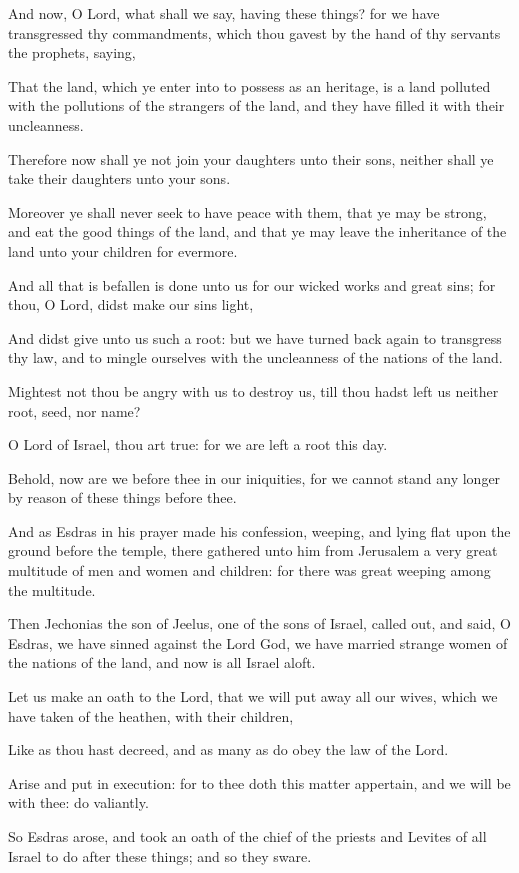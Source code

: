 {\par }{\PP {}And now, O Lord, what shall we say, having these things? for we have transgressed thy commandments, which thou gavest by the hand of thy servants the prophets, saying,
\par }{\PP {}That the land, which ye enter into to possess as an heritage, is a land polluted with the pollutions of the strangers of the land, and they have filled it with their uncleanness.
\par }{\PP {}Therefore now shall ye not join your daughters unto their sons, neither shall ye take their daughters unto your sons.
\par }{\PP {}Moreover ye shall never seek to have peace with them, that ye may be strong, and eat the good things of the land, and that ye may leave the inheritance of the land unto your children for evermore.
\par }{\PP {}And all that is befallen is done unto us for our wicked works and great sins; for thou, O Lord, didst make our sins light,
\par }{\PP {}And didst give unto us such a root: but we have turned back again to transgress thy law, and to mingle ourselves with the uncleanness of the nations of the land.
\par }{\PP {}Mightest not thou be angry with us to destroy us, till thou hadst left us neither root, seed, nor name?
\par }{\PP {}O Lord of Israel, thou art true: for we are left a root this day.
\par }{\PP {}Behold, now are we before thee in our iniquities, for we cannot stand any longer by reason of these things before thee.
\par }{\PP {}And as Esdras in his prayer made his confession, weeping, and lying flat upon the ground before the temple, there gathered unto him from Jerusalem a very great multitude of men and women and children: for there was great weeping among the multitude.
\par }{\PP {}Then Jechonias the son of Jeelus, one of the sons of Israel, called out, and said, O Esdras, we have sinned against the Lord God, we have married strange women of the nations of the land, and now is all Israel aloft.
\par }{\PP {}Let us make an oath to the Lord, that we will put away all our wives, which we have taken of the heathen, with their children,
\par }{\PP {}Like as thou hast decreed, and as many as do obey the law of the Lord.
\par }{\PP {}Arise and put in execution: for to thee doth this matter appertain, and we will be with thee: do valiantly.
\par }{\PP {}So Esdras arose, and took an oath of the chief of the priests and Levites of all Israel to do after these things; and so they sware.

}
